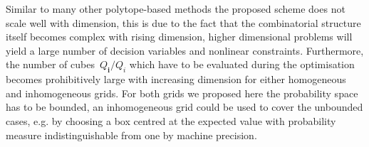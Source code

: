 \documentclass[letterpaper, 10pt, conference]{ieeeconf} %
\providecommand{\bfa}[1]{\mathbf{#1}}
\begin{document}
%
Similar to many other polytope-based methods the proposed scheme does not scale well with dimension, this is due to the fact that the combinatorial structure itself becomes complex with rising dimension, higher dimensional problems will yield a large number of decision variables and nonlinear constraints.
%
Furthermore, the number of cubes~$Q_\bfa{i}/Q_i$ which have to be evaluated during the optimisation becomes prohibitively large with increasing dimension for either homogeneous and inhomogeneous grids.
%
For both grids we proposed here the probability space has to be bounded, an inhomogeneous grid could be used to cover the unbounded cases, e.g. by choosing a box centred at the expected value with probability measure indistinguishable from one by machine precision.

\printbibliography
\end{document}
